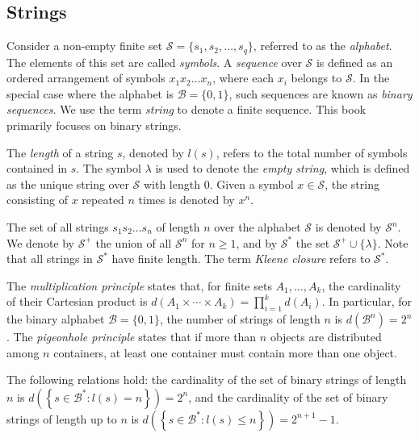 
\subsection*{Strings}

Consider a non-empty finite set $\mathcal{S} = \{ s_1, s_2, \ldots, s_q \}$, referred to as the \emph{alphabet}. The elements of this set are called \emph{symbols}. A \emph{sequence} over $\mathcal{S}$ is defined as an ordered arrangement of symbols $x_1 x_2 \dots x_n$, where each $x_i$ belongs to $\mathcal{S}$. In the special case where the alphabet is $\mathcal{B} = \{0, 1\}$, such sequences are known as \emph{binary sequences}. We use the term \emph{string} to denote a finite sequence. This book primarily focuses on binary strings.

The \emph{length} of a string $s$, denoted by $l(s)$, refers to the total number of symbols contained in $s$. The symbol $\lambda$ is used to denote the \emph{empty string}, which is defined as the unique string over $\mathcal{S}$ with length 0. Given a symbol $x \in \mathcal{S}$, the string consisting of $x$ repeated $n$ times is denoted by $x^n$.

The set of all strings $s_{1}s_{2} \ldots s_{n}$ of length $n$ over the alphabet $\mathcal{S}$ is denoted by $\mathcal{S}^{n}$. We denote by $\mathcal{S}^{+}$ the union of all $\mathcal{S}^{n}$ for $n \geq 1$, and by $\mathcal{S}^{\ast}$ the set $\mathcal{S}^{+} \cup \{\lambda\}$. Note that all strings in $\mathcal{S}^{\ast}$ have finite length. The term \emph{Kleene closure} refers to $\mathcal{S}^{\ast}$.

The \emph{multiplication principle} states that, for finite sets $A_1, \ldots, A_k$, the cardinality of their Cartesian product is $d(A_1 \times \cdots \times A_k) = \prod_{i=1}^{k} d(A_i)$.
In particular, for the binary alphabet $\mathcal{B} = \{0,1\}$, the number of strings of length $n$ is $d(\mathcal{B}^n) = 2^n$. The \emph{pigeonhole principle}  states that if more than $n$ objects are distributed among $n$ containers, at least one container must contain more than one object.

\begin{example}
The following relations hold: the cardinality of the set of binary strings of length $n$ is $d \left( \left\{ s \in \mathcal{B}^{\ast} : l(s) = n \right\} \right) = 2^n$, and the cardinality of the set of binary strings of length up to $n$ is $d \left( \left\{ s \in \mathcal{B}^{\ast} : l(s) \leq n \right\} \right) = 2^{n+1}-1$.
\end{example}

